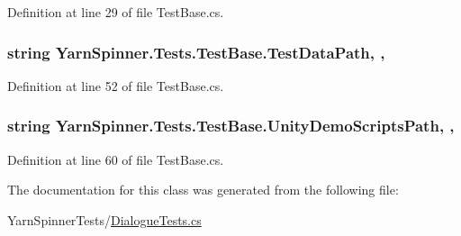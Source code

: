 Definition at line 29 of file Test\-Base.\-cs.

\hypertarget{a00160_aa9b4d902d61adad7165154a265f69aa4}{
\subsubsection[{Test\-Data\-Path}]{\setlength{\rightskip}{0pt plus 5cm}string Yarn\-Spinner.\-Tests.\-Test\-Base.\-Test\-Data\-Path\hspace{0.3cm}{\ttfamily [static]}, {\ttfamily [get]}, {\ttfamily [inherited]}}}\label{a00160_aa9b4d902d61adad7165154a265f69aa4}


Definition at line 52 of file Test\-Base.\-cs.

\hypertarget{a00160_a39922286f6255e4fd0e433a4fc7521c4}{
\subsubsection[{Unity\-Demo\-Scripts\-Path}]{\setlength{\rightskip}{0pt plus 5cm}string Yarn\-Spinner.\-Tests.\-Test\-Base.\-Unity\-Demo\-Scripts\-Path\hspace{0.3cm}{\ttfamily [static]}, {\ttfamily [get]}, {\ttfamily [inherited]}}}\label{a00160_a39922286f6255e4fd0e433a4fc7521c4}


Definition at line 60 of file Test\-Base.\-cs.



The documentation for this class was generated from the following file\-:\begin{DoxyCompactItemize}
\item 
Yarn\-Spinner\-Tests/\hyperlink{a00310}{Dialogue\-Tests.\-cs}\end{DoxyCompactItemize}
